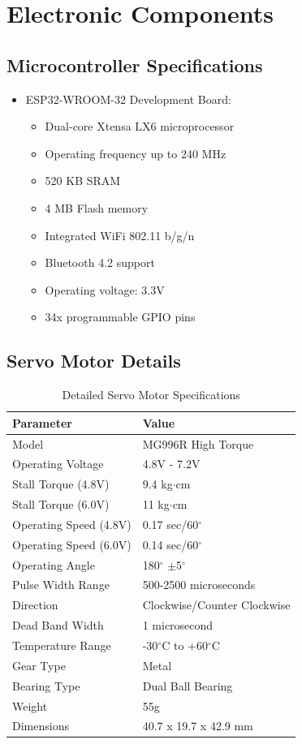 \documentclass[12pt,a4paper]{report}
\begin{document}
\section{Electronic Components}
\subsection{Microcontroller Specifications}
\begin{itemize}
\item ESP32-WROOM-32 Development Board:
\begin{itemize}
\item Dual-core Xtensa LX6 microprocessor
\item Operating frequency up to 240 MHz
\item 520 KB SRAM
\item 4 MB Flash memory
\item Integrated WiFi 802.11 b/g/n
\item Bluetooth 4.2 support
\item Operating voltage: 3.3V
\item 34x programmable GPIO pins
\end{itemize}
\end{itemize}
\subsection{Servo Motor Details}
\begin{table}[h]
\centering
\begin{tabular}{|l|l|}
\hline
\textbf{Parameter} & \textbf{Value} \\
\hline
Model & MG996R High Torque \\
Operating Voltage & 4.8V - 7.2V \\
Stall Torque (4.8V) & 9.4 kg$\cdot$cm \\
Stall Torque (6.0V) & 11 kg$\cdot$cm \\
Operating Speed (4.8V) & 0.17 sec/60$^{\circ}$ \\
Operating Speed (6.0V) & 0.14 sec/60$^{\circ}$ \\
Operating Angle & 180$^{\circ}$ $\pm$5$^{\circ}$ \\
Pulse Width Range & 500-2500 microseconds \\
Direction & Clockwise/Counter Clockwise \\
Dead Band Width & 1 microsecond \\
Temperature Range & -30$^{\circ}$C to +60$^{\circ}$C \\
Gear Type & Metal \\
Bearing Type & Dual Ball Bearing \\
Weight & 55g \\
Dimensions & 40.7 x 19.7 x 42.9 mm \\
\hline
\end{tabular}
\caption{Detailed Servo Motor Specifications}
\end{table}
\end{document}
